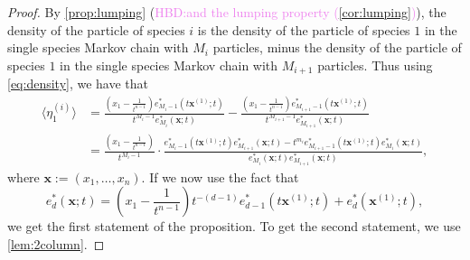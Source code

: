 \documentclass[12pt]{amsart}
\theoremstyle{definition}
\newcommand{\bfx}{\boldsymbol{x}}
\def\LW#1{(\textcolor{teal}{LW:#1})}
\def\HBD#1{(\textcolor{violet}{HBD:#1})}
\begin{document}
\begin{proof}
By \cref{prop:lumping} \HBD{and the lumping property (\cref{cor:lumping})},  the density of the particle
    of species $i$ is the density of the particle of species $1$ in the single species
    Markov chain with $M_i$ particles, minus the density of the particle of species $1$
    in the single species Markov chain with $M_{i+1}$ particles.
    Thus using \cref{eq:density}, we have that 
     \begin{align*}
       \langle \eta_1^{(i)} \rangle &= 
       \frac{(x_1-\frac{1}{t^{n-1}}) e^*_{M_i-1}\left(t\bfx^{(1)};t\right)}{t^{M_i-1} e^*_{M_i}(\bfx;t)}  - \frac{(x_1-\frac{1}{t^{n-1}}) e^*_{M_{i+1}-1}\left(t\bfx^{(1)};t\right)}{t^{M_{i+1}-1} e^*_{M_{i+1}}(\bfx;t)} \\
       &= \frac{(x_1-\frac{1}{t^{n-1}})}{t^{M_{i}-1}} \cdot 
       \frac{e^*_{M_i-1}\left(t\bfx^{(1)};t\right) e^*_{M_{i+1}}(\bfx;t)-t^{m_i} e^*_{M_{i+1}-1}\left(t\bfx^{(1)};t\right) e^*_{M_i}(\bfx;t)}{e^*_{M_i}(\bfx;t) e^*_{M_{i+1}}(\bfx;t)}, \label{eq:sofar}
   \end{align*}
   where $\bfx:=(x_1,\dots,x_n)$.
If we now use the fact that 
\begin{equation}
e^*_d(\bfx;t) = \left(x_1-\frac{1}{t^{n-1}}\right) t^{-(d-1)} e^*_{d-1}\left(t\bfx^{(1)};t\right) + e^*_d\left(\bfx^{(1)};t\right),    
\end{equation}
we get the first statement of the proposition.  To get the second statement, we use \cref{lem:2column}.
\end{proof}

\end{document}
